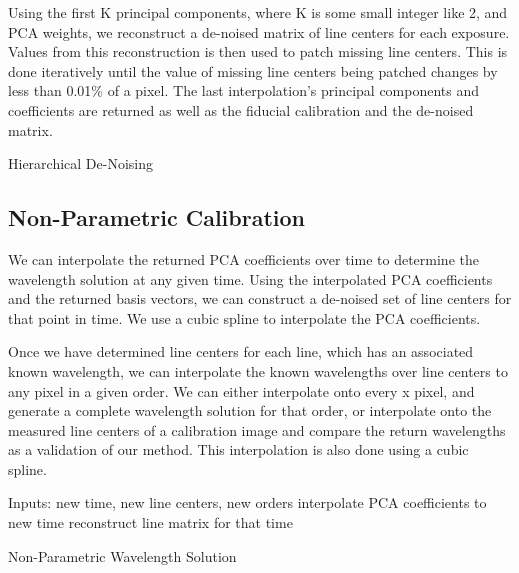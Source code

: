\documentclass[12pt, letterpaper]{article}
\begin{document}
Using the first K principal components, where K is some small integer like 2, and PCA weights, we reconstruct a de-noised matrix of line centers for each exposure.  Values from this reconstruction is then used to patch missing line centers.  This is done iteratively until the value of missing line centers being patched changes by less than 0.01\% of a pixel.  The last interpolation's principal components and coefficients are returned as well as the fiducial calibration and the de-noised matrix.

\begin{algorithm}
\SetAlgoLined
{}
\caption{Hierarchical De-Noising}
\end{algorithm}

\subsection{Non-Parametric Calibration} \label{sec:nonparam}
We can interpolate the returned PCA coefficients over time to determine the wavelength solution at any given time.  Using the interpolated PCA coefficients and the returned basis vectors, we can construct a de-noised set of line centers for that point in time.  We use a cubic spline to interpolate the PCA coefficients.

Once we have determined line centers for each line, which has an associated known wavelength, we can interpolate the known wavelengths over line centers to any pixel in a given order.  We can either interpolate onto every x pixel, and generate a complete wavelength solution for that order, or interpolate onto the measured line centers of a calibration image and compare the return wavelengths as a validation of our method.  This interpolation is also done using a cubic spline.

\begin{algorithm}
\SetAlgoLined
Inputs: new time, new line centers, new orders\; %
interpolate PCA coefficients to new time\;
reconstruct line matrix for that time\;
\caption{Non-Parametric Wavelength Solution}
\end{algorithm}
\end{document}
